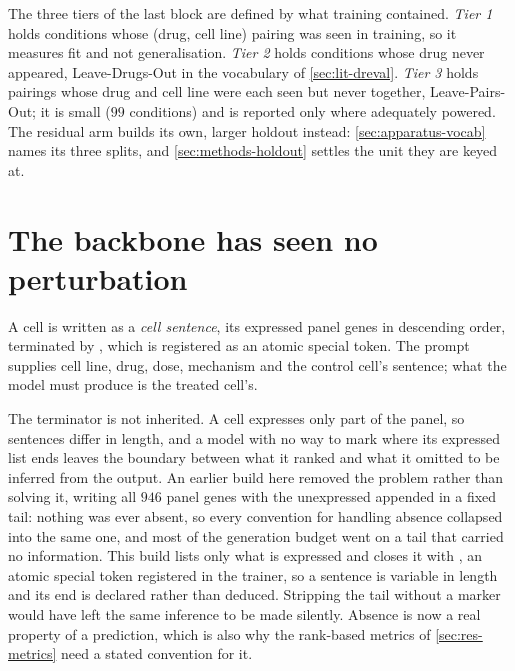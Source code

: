 
The three tiers of the last block are defined by what training contained.
\emph{Tier 1} holds conditions whose (drug, cell line) pairing was
seen in training, so it measures fit and not generalisation. \emph{Tier 2} holds
conditions whose drug never appeared, Leave-Drugs-Out in the vocabulary of
\cref{sec:lit-dreval}. \emph{Tier 3} holds pairings whose drug and cell line
were each seen but never together, Leave-Pairs-Out; it is small ($99$
conditions) and is reported only where adequately powered. The residual arm
builds its own, larger holdout instead: \cref{sec:apparatus-vocab} names its
three splits, and \cref{sec:methods-holdout} settles the unit they are keyed
at.

\section{The backbone has seen no perturbation}

A cell is written as a \emph{cell sentence}, its expressed panel genes in
descending order, terminated by \ENDCELL{}, which is registered as an atomic
special token. The prompt supplies cell line, drug, dose, mechanism and the
control cell's sentence; what the model must produce is the treated cell's. 

The terminator is not inherited. A cell expresses only part of the panel, so
sentences differ in length, and a model with no way to mark where its expressed
list ends leaves the boundary between what it ranked and what it omitted to be
inferred from the output. An earlier build here removed the problem rather than
solving it, writing all $946$ panel genes with the unexpressed appended in a
fixed tail: nothing was ever absent, so every convention for handling absence
collapsed into the same one, and most of the generation budget went on a tail
that carried no information. This build lists only what is expressed and closes
it with \ENDCELL{}, an atomic special token registered in the trainer, so a
sentence is variable in length and its end is declared rather than deduced.
Stripping the tail without a marker would have left the same inference to be made
silently. Absence is now a real property of a prediction, which is also why the
rank-based metrics of \cref{sec:res-metrics} need a stated convention for it.

